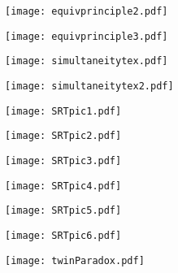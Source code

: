 \begin{figure}[hbtp!]
\centering
 \texttt{[image: equivprinciple2.pdf]}
\caption{}
\end{figure}
\begin{figure}[hbtp!]
\centering
 \texttt{[image: equivprinciple3.pdf]}
\caption{}
\end{figure}
\begin{figure}[hbtp!]
\centering
 \texttt{[image: simultaneitytex.pdf]}
\caption{}
\end{figure}
\begin{figure}[hbtp!]
\centering
 \texttt{[image: simultaneitytex2.pdf]}
\caption{}
\end{figure}
\begin{figure}[hbtp!]
\centering
 \texttt{[image: SRTpic1.pdf]}
\caption{}
\end{figure}
\begin{figure}[hbtp!]
\centering
 \texttt{[image: SRTpic2.pdf]}
\caption{}
\end{figure}
\begin{figure}[hbtp!]
\centering
 \texttt{[image: SRTpic3.pdf]}
\caption{}
\end{figure}
\begin{figure}[hbtp!]
\centering
 \texttt{[image: SRTpic4.pdf]}
\caption{}
\end{figure}
\begin{figure}[hbtp!]
\centering
 \texttt{[image: SRTpic5.pdf]}
\caption{}
\end{figure}
\begin{figure}[hbtp!]
\centering
 \texttt{[image: SRTpic6.pdf]}
\caption{}
\end{figure}
\begin{figure}[hbtp!]
\centering
 \texttt{[image: twinParadox.pdf]}
\caption{}
\end{figure}




